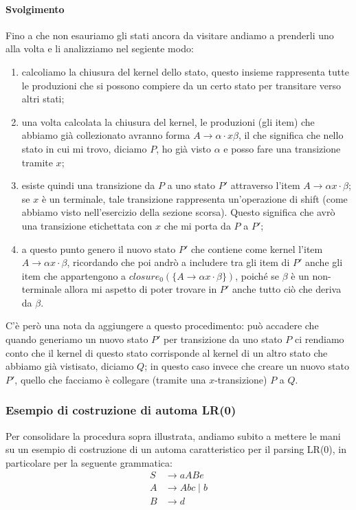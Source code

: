 \documentclass[class=book, crop=false, oneside, 12pt]{standalone}
\begin{document}
\paragraph{Svolgimento}
Fino a che non esauriamo gli stati ancora da visitare andiamo a prenderli uno alla volta e li analizziamo nel segiente modo:
\begin{enumerate}
    \item calcoliamo la chiusura del kernel dello stato, questo insieme rappresenta tutte le produzioni che si possono compiere da un certo stato per transitare verso altri stati;
    \item una volta calcolata la chiusura del kernel, le produzioni (gli item) che abbiamo già collezionato avranno forma \(A \to \alpha \cdot x \beta\), il che significa che nello stato in cui mi trovo, diciamo \(P\), ho già visto \(\alpha\) e posso fare una transizione tramite \(x\);
    \item esiste quindi una transizione da \(P\) a uno stato \(P'\) attraverso l'item \(A \to \alpha x \cdot \beta\); se \(x\) è un terminale, tale transizione rappresenta un'operazione di shift (come abbiamo visto nell'esercizio della sezione scorsa). Questo significa che avrò una transizione etichettata con \(x\) che mi porta da \(P\) a \(P'\);
    \item a questo punto genero il nuovo stato \(P'\) che contiene come kernel l'item \(A \to \alpha x \cdot \beta\), ricordando che poi andrò a includere tra gli item di \(P'\) anche gli item che appartengono a \(closure_0 (\{ A \to \alpha x \cdot \beta \})\), poiché se \(\beta\) è un non-terminale allora mi aspetto di poter trovare in \(P'\) anche tutto ciò che deriva da \(\beta\).
\end{enumerate}
C'è però una nota da aggiungere a questo procedimento: può accadere che quando generiamo un nuovo stato \(P'\) per transizione da uno stato \(P\) ci rendiamo conto che il kernel di questo stato corrisponde al kernel di un altro stato che abbiamo già vistisato, diciamo \(Q\); in questo caso invece che creare un nuovo stato \(P'\), quello che facciamo è collegare (tramite una \(x\)-transizione) \(P\) a \(Q\).

\subsubsection{Esempio di costruzione di automa LR(0)}
\label{subsubsec:esercizio_costruzione_automa_lr0}
Per consolidare la procedura sopra illustrata, andiamo subito a mettere le mani su un esempio di costruzione di un automa caratteristico per il parsing LR(0), in particolare per la seguente grammatica:
\begin{align*}
    S &\to aABe \\
    A &\to Abc \mid b \\
    B &\to d
\end{align*}
\end{document}
